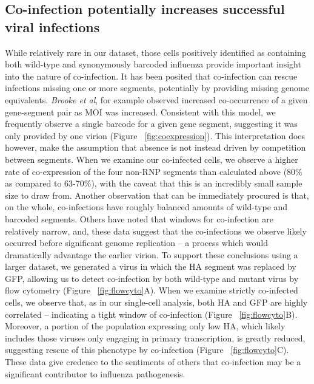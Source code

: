 \documentclass[9pt,lineno]{elife}
\begin{document}
\subsection{Co-infection potentially increases successful viral infections}
While relatively rare in our dataset, those cells positively identified as containing both wild-type and synonymously barcoded influenza provide important insight into the nature of co-infection. 
It has been posited that co-infection can rescue infections missing one or more segments, potentially by providing missing genome equivalents.
\emph{Brooke et al}, for example observed increased co-occurrence of a given gene-segment pair as MOI was increased. 
Consistent with this model, we frequently observe a single barcode for a given gene segment, suggesting it was only provided by one virion (Figure ~\ref{fig:coexpression}).
This interpretation does however, make the assumption that absence is not instead driven by competition between segments.
When we examine our co-infected cells, we observe a higher rate of co-expression of the four non-RNP segments than calculated above (80\% as compared to 63-70\%), with the caveat that this is an incredibly small sample size to draw from.
Another observation that can be immediately procured is that, on the whole, co-infections have roughly balanced amounts of wild-type and barcoded segments. 
Others have noted that windows for co-infection are relatively narrow, and, these data suggest that the co-infections we observe likely occurred before significant genome replication -- a process which would dramatically advantage the earlier virion.
To support these conclusions using a larger dataset, we generated a virus in which the HA segment was replaced by GFP, allowing us to detect co-infection by both wild-type and mutant virus by flow cytometry (Figure ~\ref{fig:flowcyto}A).
When we examine strictly co-infected cells, we observe that, as in our single-cell analysis, both HA and GFP are highly correlated -- indicating a tight window of co-infection (Figure ~\ref{fig:flowcyto}B).
Moreover, a portion of the population expressing only low HA, which likely includes those viruses only engaging in primary transcription, is greatly reduced, suggesting rescue of this phenotype by co-infection (Figure ~\ref{fig:flowcyto}C). 
These data give credence to the sentiments of others that co-infection may be a significant contributor to influenza pathogenesis.
\end{document}
